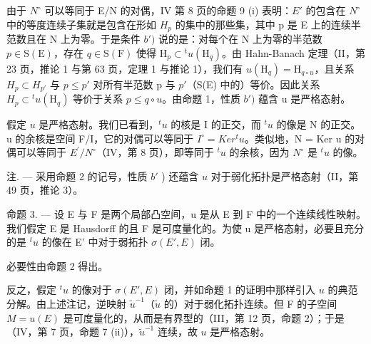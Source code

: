 由于 \(N^{\circ}\) 可以等同于 E/N 的对偶，IV 第 8 页的命题 9 (i) 表明：\(E'\) 的包含在 \(N^{\circ}\) 中的等度连续子集就是包含在形如 \(H_{p}\) 的集中的那些集，其中 p 是 E 上的连续半范数且在 N 上为零。于是条件 \(b')\) 说的是：对每个在 N 上为零的半范数 \(p \in \mathrm{S}(\mathrm{E})\)，存在 \(q \in \mathrm{S}(\mathrm{F})\) 使得 \(\mathrm{H}_{p} \subset {}^{t}u(\mathrm{H}_{q})\)。由 Hahn-Banach 定理（II，第 23 页，推论 1 与第 63 页，定理 1 与推论 1），我们有 \(u(\mathrm{H}_{q}) = \mathrm{H}_{q \circ u}\)，且关系 \(H_{p} \subset H_{p'}\) 与 \(p \leqslant p'\) 对所有半范数 p 与 \(p'\)（S(E) 中的）等价。因此关系 \(H_{p} \subset {}^{t}u(\mathrm{H}_{q})\) 等价于关系 \(p \leqslant q \circ u\)。由命题 1，性质 \(b')\) 蕴含 u 是严格态射。

假定 \(u\) 是严格态射。我们已看到，\(^t u\) 的核是 I 的正交，而 \(^t u\) 的像是 N 的正交。u 的余核是空间 F/I，它的对偶可以等同于 \(I^{\circ} = Ker^{t}u\)。类似地，N = Ker u 的对偶可以等同于 \(E^{\prime}/N^{\circ}\)（IV，第 8 页），即等同于 \(^{t}u\) 的余核，因为 \(N^{\circ}\) 是 \(^{t}u\) 的像。

注. --- 采用命题 2 的记号，性质 \(b'\) ) 还蕴含 \(u\) 对于弱化拓扑是严格态射（II，第 49 页，推论 3）。

命题 3. --- 设 E 与 F 是两个局部凸空间，u 是从 E 到 F 中的一个连续线性映射。我们假定 E 是 Hausdorff 的且 F 是可度量化的。为使 u 是严格态射，必要且充分的是 \({}^t u\) 的像在 E' 中对于弱拓扑 \(\sigma(E', E)\) 闭。

必要性由命题 2 得出。

反之，假定 \(^t u\) 的像对于 \(\sigma(E', E)\) 闭，并如命题 1 的证明中那样引入 \(u\) 的典范分解。由上述注记，逆映射 \(\tilde{u}^{-1}\)（\(\tilde{u}\) 的）对于弱化拓扑连续。但 F 的子空间 \(M = u(E)\) 是可度量化的，从而是有界型的（III，第 12 页，命题 2）；于是（IV，第 7 页，命题 7 (ii)），\(\tilde{u}^{-1}\) 连续，故 \(u\) 是严格态射。
\relax{}
